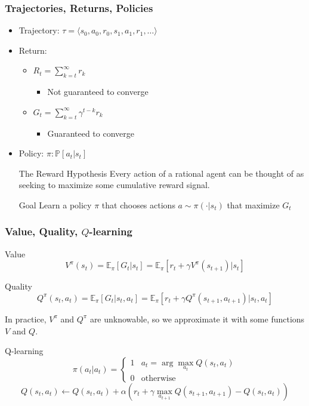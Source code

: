 \documentclass{beamer}
\begin{document}
\begin{frame}
  \frametitle{Trajectories, Returns, Policies}
  \begin{itemize}
    \item Trajectory: $\tau = \langle s_0, a_0, r_0, s_1, a_1, r_1, \dots \rangle$
    \item Return:
    \begin{itemize}
      \item $R_t = \sum_{k=t}^\infty r_k$
      \begin{itemize}
        \item Not guaranteed to converge
      \end{itemize}
      \item $G_t = \sum_{k=t}^\infty \gamma^{t-k}r_k$
      \begin{itemize}
        \item Guaranteed to converge
      \end{itemize}
    \end{itemize}
    \item Policy: $\pi : \mathbb{P} \left[ a_t \vert s_t \right]$
      \begin{block}{The Reward Hypothesis}
        Every action of a rational agent can be thought of as seeking to maximize some cumulative reward signal.
      \end{block}
      \begin{exampleblock}{Goal}
        Learn a policy $\pi$ that chooses actions $a \sim \pi(\cdot \vert s_t)$ that maximize $G_t$
      \end{exampleblock}
  \end{itemize}
\end{frame}

\begin{frame}
  \frametitle{Value, Quality, $Q$-learning}
  \begin{block}{Value}$$V^\pi(s_t) = \mathbb{E}_\pi \left[ G_t \vert s_t \right] = \mathbb{E}_\pi \left[ r_t + \gamma V^\pi(s_{t+1}) \vert s_t \right]$$
  \end{block}
  \begin{block}{Quality}
  $$Q^\pi(s_t, a_t) = \mathbb{E}_\pi \left[ G_t \vert s_t, a_t \right] = \mathbb{E}_\pi \left[ r_t + \gamma Q^\pi(s_{t+1}, a_{t+1}) \vert s_t, a_t \right]$$
\end{block}
  In practice, $V^\pi$ and $Q^\pi$ are unknowable, so we approximate it with some functions $V$ and $Q$.
\begin{exampleblock}{Q-learning}
  \begin{equation*}
    \pi(a_t \vert a_t) = \begin{cases} 1 & a_t = \arg \max_{a_t} Q(s_t, a_t) \\ 0 & \text{otherwise} \end{cases}
  \end{equation*}
  \begin{equation*}
    Q(s_t, a_t) \gets Q(s_t, a_t) + \alpha(r_t + \gamma \max_{a_{t+1}} Q(s_{t+1}, a_{t+1}) - Q(s_t, a_t))
  \end{equation*}
\end{exampleblock}
\end{frame}
\end{document}
